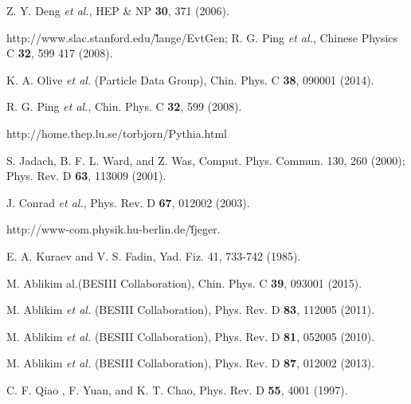 \documentclass[aps,preprint,superscriptaddress,12pt,tightenlines]{revtex4}
\begin{document}
\begin{thebibliography}{**}
 Z. Y. Deng {\em et al.},
HEP \& NP {\bf 30}, 371 (2006).

 http://www.slac.stanford.edu/\~lange/EvtGen;
R. G. Ping {\em et al.}, Chinese Physics C {\bf 32}, 599 417 (2008).

 K. A. Olive {\em et al.} (Particle Data Group),
Chin. Phys. C {\bf 38}, 090001 (2014).

 R. G. Ping {\em et al.},
Chin. Phys. C {\bf 32}, 599 (2008).

 http://home.thep.lu.se/torbjorn/Pythia.html

 S. Jadach, B. F. L. Ward, and Z. Was,
Comput. Phys. Commun. 130, 260 (2000);
Phys. Rev. D {\bf 63}, 113009 (2001).

 J. Conrad {\em et al.},
Phys. Rev. D {\bf 67}, 012002 (2003).

 http://www-com.physik.hu-berlin.de/\~fjeger.

 E. A. Kuraev and V. S. Fadin, Yad. Fiz. 41, 733-742 (1985).

 M. Ablikim al.(BESIII Collaboration),
Chin. Phys. C {\bf 39}, 093001 (2015).

M. Ablikim {\em et al.} (BESIII Collaboration),
Phys. Rev. D {\bf 83}, 112005 (2011).

M. Ablikim {\em et al.} (BESIII Collaboration),
Phys. Rev. D {\bf 81}, 052005 (2010).

M. Ablikim {\em et al.} (BESIII Collaboration),
Phys. Rev. D {\bf 87}, 012002 (2013).

 C. F. Qiao , F. Yuan, and K. T. Chao,
Phys. Rev. D {\bf 55}, 4001 (1997).

\end{thebibliography}
\end{document}
